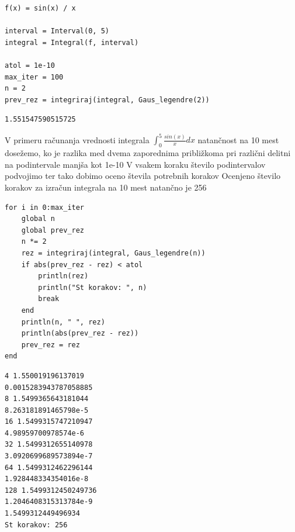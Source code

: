 \documentclass[12pt,a4paper]{article}
\begin{document}
\begin{verbatim}
f(x) = sin(x) / x

interval = Interval(0, 5)
integral = Integral(f, interval)

atol = 1e-10
max_iter = 100
n = 2
prev_rez = integriraj(integral, Gaus_legendre(2))
\end{verbatim}
\begin{verbatim}
1.551547590515725
\end{verbatim}

V primeru računanja vrednosti integrala $\int_0^5 \frac{sin(x)}{x}dx$ natančnost na 10 mest dosežemo, ko je razlika med dvema zaporednima približkoma pri različni delitni na podintervale manjša kot 1e-10 V vsakem koraku število podintervalov podvojimo ter tako dobimo oceno števila potrebnih korakov Ocenjeno število korakov za izračun integrala na 10 mest natančno je 256


\begin{verbatim}
for i in 0:max_iter
    global n
    global prev_rez
    n *= 2
    rez = integriraj(integral, Gaus_legendre(n))
    if abs(prev_rez - rez) < atol
        println(rez)
        println("St korakov: ", n)
        break
    end
    println(n, " ", rez)
    println(abs(prev_rez - rez))
    prev_rez = rez
end
\end{verbatim}
\begin{verbatim}
4 1.550019196137019
0.0015283943787058885
8 1.5499365643181044
8.263181891465798e-5
16 1.5499315747210947
4.98959700978574e-6
32 1.5499312655140978
3.0920699689573894e-7
64 1.5499312462296144
1.928448334354016e-8
128 1.5499312450249736
1.2046408315313784e-9
1.5499312449496934
St korakov: 256
\end{verbatim}
\end{document}
